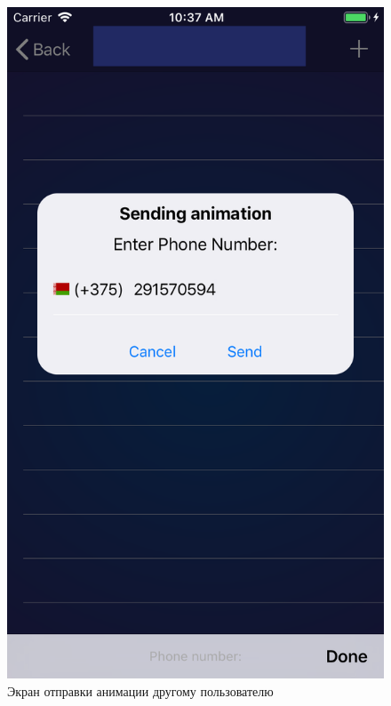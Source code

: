 \begin{figure}[H]
\centering
	\includegraphics[scale=0.2]{figures/userGuide/sendingAnimation.png}
	\caption{Экран отправки анимации другому пользователю}
	\label{fig:develop:userGuide:sendingAnimation}
\end{figure}

